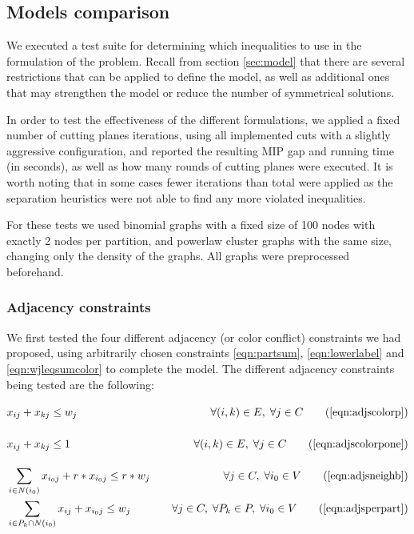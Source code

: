 
\subsection{Models comparison}

We executed a test suite for determining which inequalities to use in the formulation of the problem. Recall from section \ref{sec:model} that there are several restrictions that can be applied to define the model, as well as additional ones that may strengthen the model or reduce the number of symmetrical solutions.

In order to test the effectiveness of the different formulations, we applied a fixed number of cutting planes iterations, using all implemented cuts with a slightly aggressive configuration, and reported the resulting MIP gap and running time (in seconds), as well as how many rounds of cutting planes were executed. It is worth noting that in some cases fewer iterations than total were applied as the separation heuristics were not able to find any more violated inequalities.

For these tests we used binomial graphs with a fixed size of 100 nodes with exactly 2 nodes per partition, and powerlaw cluster graphs with the same size, changing only the density of the graphs. All graphs were preprocessed beforehand.

\subsubsection*{Adjacency constraints}

We first tested the four different adjacency (or color conflict) constraints we had proposed, using arbitrarily chosen constraints \ref{eqn:partsum}, \ref{eqn:lowerlabel} and \ref{eqn:wjleqsumcolor} to complete the model. The different adjacency constraints being tested are the following: 

\begin{align*}
&x_{ij} + x_{kj} \leq w_j \sumheight &\quad \forall (i,k) \in E, \; \forall j \in C \tag{\ref{eqn:adjscolorp}} \\
&x_{ij} + x_{kj} \leq 1 \sumheight &\quad \forall (i,k) \in E, \; \forall j \in C \tag{\ref{eqn:adjscolorpone}} \\
&\sum_{i \in N(i_0)} x_{i_0j} + r * x_{i_0j} \leq r * w_j &\quad \forall j \in C, \; \forall i_0 \in V \tag{\ref{eqn:adjsneighb}} \\
&\sum_{i \in P_k \cap N(i_0)} x_{ij} + x_{i_0j} \leq w_j &\quad \forall j \in C, \; \forall P_k \in P, \; \forall i_0 \in V \tag{\ref{eqn:adjsperpart}} 
\end{align*}

